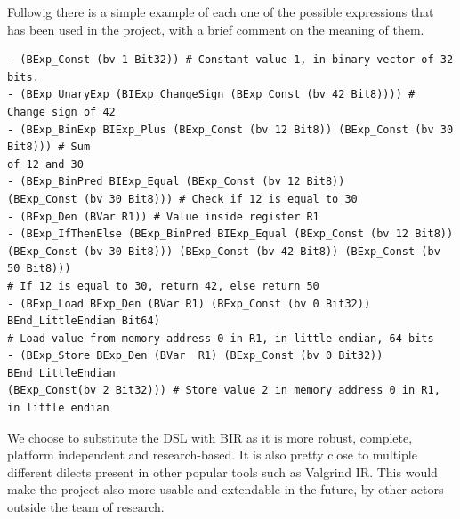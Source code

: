 Followig there is a simple example of each one of the possible expressions that
has been used in the project, with a brief comment on the meaning of them.
\begin{verbatim}
- (BExp_Const (bv 1 Bit32)) # Constant value 1, in binary vector of 32 bits.
- (BExp_UnaryExp (BIExp_ChangeSign (BExp_Const (bv 42 Bit8)))) # Change sign of 42
- (BExp_BinExp BIExp_Plus (BExp_Const (bv 12 Bit8)) (BExp_Const (bv 30 Bit8))) # Sum
of 12 and 30
- (BExp_BinPred BIExp_Equal (BExp_Const (bv 12 Bit8)) 
(BExp_Const (bv 30 Bit8))) # Check if 12 is equal to 30
- (BExp_Den (BVar R1)) # Value inside register R1
- (BExp_IfThenElse (BExp_BinPred BIExp_Equal (BExp_Const (bv 12 Bit8)) 
(BExp_Const (bv 30 Bit8))) (BExp_Const (bv 42 Bit8)) (BExp_Const (bv 50 Bit8))) 
# If 12 is equal to 30, return 42, else return 50
- (BExp_Load BExp_Den (BVar R1) (BExp_Const (bv 0 Bit32)) BEnd_LittleEndian Bit64) 
# Load value from memory address 0 in R1, in little endian, 64 bits
- (BExp_Store BExp_Den (BVar  R1) (BExp_Const (bv 0 Bit32)) BEnd_LittleEndian 
(BExp_Const(bv 2 Bit32))) # Store value 2 in memory address 0 in R1, in little endian
\end{verbatim}

We choose to substitute the DSL with BIR as it is more robust, complete, platform
independent and research-based. It is also pretty close to multiple different
dilects present in other popular tools such as Valgrind IR. This would make the project
also more usable and extendable in the future, by other actors outside the team
of research.